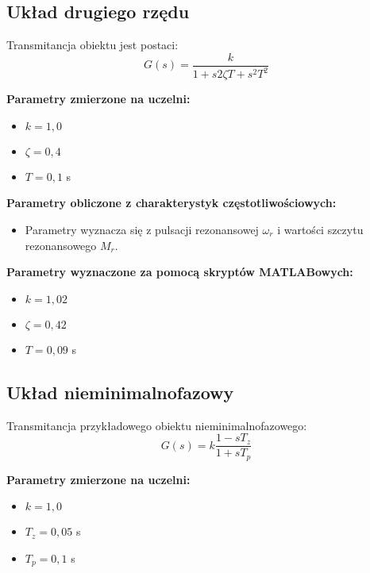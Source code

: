 \documentclass[12pt,a4paper]{article}
\begin{document}
	\subsection{Układ drugiego rzędu}
	Transmitancja obiektu jest postaci:
	\begin{equation}
		G(s) = \frac{k}{1+s 2\zeta T + s^2 T^2}
	\end{equation}
	
	\noindent \textbf{Parametry zmierzone na uczelni:}
	\begin{itemize}
		\item $k = 1{,}0$ %
		\item $\zeta = 0{,}4$ %
		\item $T = 0{,}1$ s %
	\end{itemize}
	
	\noindent \textbf{Parametry obliczone z charakterystyk częstotliwościowych:}
	\begin{itemize}
		\item Parametry wyznacza się z pulsacji rezonansowej $\omega_r$ i wartości szczytu rezonansowego $M_r$.
	\end{itemize}
	
	\noindent \textbf{Parametry wyznaczone za pomocą skryptów MATLABowych:}
	\begin{itemize}
		\item $k = 1{,}02$ %
		\item $\zeta = 0{,}42$ %
		\item $T = 0{,}09$ s %
	\end{itemize}
	
	\subsection{Układ nieminimalnofazowy}
	Transmitancja przykładowego obiektu nieminimalnofazowego:
	\begin{equation}
		G(s) = k \frac{1-sT_z}{1+sT_p}
	\end{equation}
	
	\noindent \textbf{Parametry zmierzone na uczelni:}
	\begin{itemize}
		\item $k = 1{,}0$ %
		\item $T_z = 0{,}05$ s %
		\item $T_p = 0{,}1$ s %
	\end{itemize}
	
\end{document}
